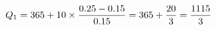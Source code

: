 \documentclass[preview]{standalone}
\begin{document}
\begin{align*}
\special{dvisvgm:raw <g id='unique000'>}Q_1=365+10\times\frac{0.25-0.15}{0.15}=365+\frac{20}{3}=\frac{1115}{3}\special{dvisvgm:raw </g>}
\end{align*}
\end{document}
